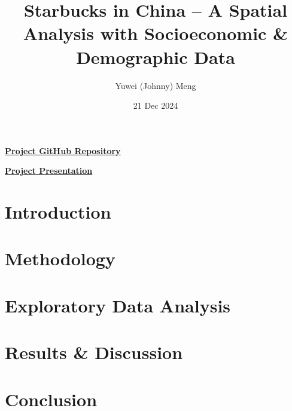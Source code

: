 \documentclass{article}
\title{Starbucks in China -- A Spatial Analysis with Socioeconomic \& Demographic Data}
\author{Yuwei (Johnny) Meng}
\date{21 Dec 2024}
\begin{document}
\pagestyle{fancy}

\maketitle

\href{https://github.com/BullDF/starbucks-in-china}{\textbf{Project GitHub Repository}}

\href{https://play.library.utoronto.ca/watch/c4d71902f00f5e6fe91bea00974fce6c}{\textbf{Project Presentation}}

\section{Introduction}

\section{Methodology}

\section{Exploratory Data Analysis}

\section{Results \& Discussion}

\section{Conclusion}
\end{document}
